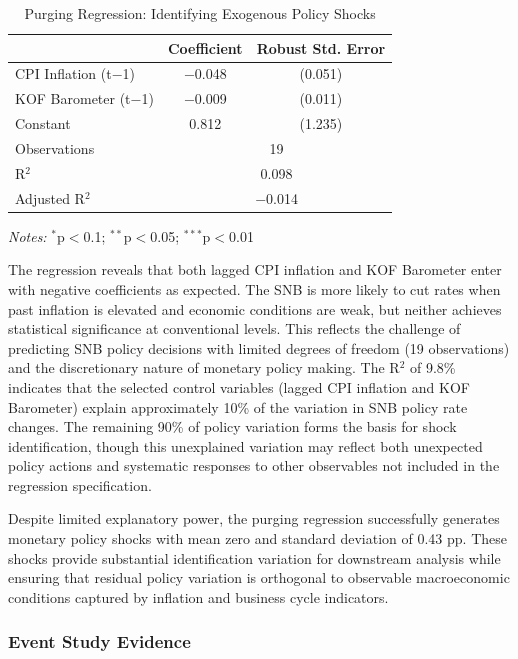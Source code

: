 \documentclass[12pt,a4paper]{article}
\begin{document}
\begin{table}[H]
	\centering
	\caption{Purging Regression: Identifying Exogenous Policy Shocks}
	\label{tab:purging_regression}
	\small
	\begin{tabular}{lcc}
		\toprule
		& Coefficient & Robust Std. Error \\
		\midrule
		CPI Inflation (t$-$1) & $-$0.048 & (0.051) \\
		KOF Barometer (t$-$1) & $-$0.009 & (0.011) \\
		Constant              & 0.812    & (1.235) \\
		\midrule
		Observations          & \multicolumn{2}{c}{19} \\
		R$^{2}$              & \multicolumn{2}{c}{0.098} \\
		Adjusted R$^{2}$     & \multicolumn{2}{c}{$-$0.014} \\
		\bottomrule
	\end{tabular}
	
	\vspace{0.2cm}
	\footnotesize 
	\textit{Notes:} $^{*}$p$<$0.1; $^{**}$p$<$0.05; $^{***}$p$<$0.01
\end{table}

The regression reveals that both lagged CPI inflation and KOF Barometer enter with negative coefficients as expected. The SNB is more likely to cut rates when past inflation is elevated and economic conditions are weak, but neither achieves statistical significance at conventional levels. This reflects the challenge of predicting SNB policy decisions with limited degrees of freedom (19 observations) and the discretionary nature of monetary policy making. The R$^{2}$ of 9.8\% indicates that the selected control variables (lagged CPI inflation and KOF Barometer) explain approximately 10\% of the variation in SNB policy rate changes. The remaining 90\% of policy variation forms the basis for shock identification, though this unexplained variation may reflect both unexpected policy actions and systematic responses to other observables not included in the regression specification.

Despite limited explanatory power, the purging regression successfully generates monetary policy shocks with mean zero and standard deviation of 0.43 pp. These shocks provide substantial identification variation for downstream analysis while ensuring that residual policy variation is orthogonal to observable macroeconomic conditions captured by inflation and business cycle indicators.

\subsubsection{Event Study Evidence}
\end{document}
